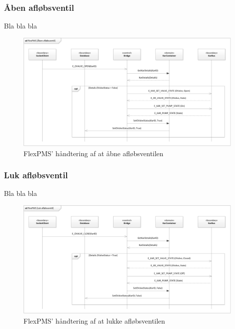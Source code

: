 \subsubsection{Åben afløbsventil}

Bla bla bla

\begin{figure}[H]
	\centering
	\includegraphics[scale=.6]{SoftwareArkitektur/FlexPMS/Diagrammer/Case_OpenOValve.png}
	\caption{FlexPMS' håndtering af at åbne afløbsventilen}
	\label{photo:OpenOValveUseCase}
\end{figure}


\subsubsection{Luk afløbsventil}

Bla bla bla

\begin{figure}[H]
	\centering
	\includegraphics[scale=.6]{SoftwareArkitektur/FlexPMS/Diagrammer/Case_CloseOValve.png}
	\caption{FlexPMS' håndtering af at lukke afløbsventilen}
	\label{photo:CloseOValveUseCase}
\end{figure}


